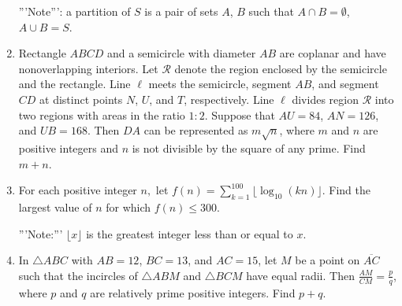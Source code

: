 \documentclass{article}
\begin{document}
\begin{enumerate}[label=\arabic*., itemsep=0.5em]
'''Note''': a partition of $S$ is a pair of sets $A$, $B$ such that $A \cap B = \emptyset$, $A \cup B = S$.\par \vspace{0.5em}\item Rectangle $ABCD$ and a semicircle with diameter $AB$ are coplanar and have nonoverlapping interiors. Let $\mathcal{R}$ denote the region enclosed by the semicircle and the rectangle. Line $\ell$ meets the semicircle, segment $AB$, and segment $CD$ at distinct points $N$, $U$, and $T$, respectively. Line $\ell$ divides region $\mathcal{R}$ into two regions with areas in the ratio $1: 2$. Suppose that $AU = 84$, $AN = 126$, and $UB = 168$. Then $DA$ can be represented as $m\sqrt {n}$, where $m$ and $n$ are positive integers and $n$ is not divisible by the square of any prime. Find $m + n$.\par \vspace{0.5em}\item For each positive integer $n,$ let $f(n) = \sum_{k = 1}^{100} \lfloor \log_{10} (kn) \rfloor$. Find the largest value of $n$ for which $f(n) \le 300$.

'''Note:''' $\lfloor x \rfloor$ is the greatest integer less than or equal to $x$.\par \vspace{0.5em}\item In $\triangle{ABC}$ with $AB = 12$, $BC = 13$, and $AC = 15$, let $M$ be a point on $\overline{AC}$ such that the incircles of $\triangle{ABM}$ and $\triangle{BCM}$ have equal radii. Then $\frac{AM}{CM} = \frac{p}{q}$, where $p$ and $q$ are relatively prime positive integers. Find $p + q$.\par \vspace{0.5em}\end{enumerate}
\end{document}

